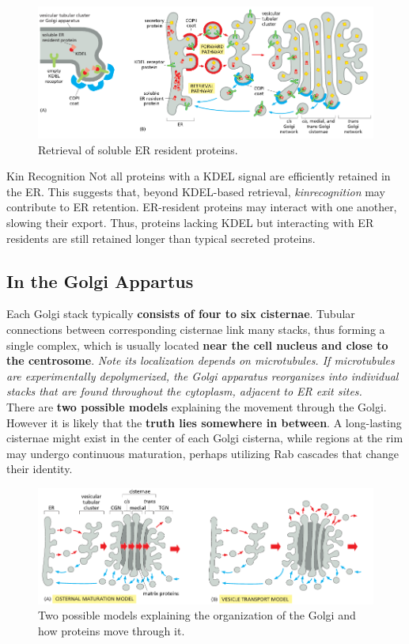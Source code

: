 \documentclass[../main.tex]{subfiles}
\begin{document}
\begin{figure}[H]
	\centering
	\includegraphics[width= \textwidth]{20}
	\caption{Retrieval of soluble ER resident proteins.}
\end{figure}

\begin{RemarkWithTitel}{Kin Recognition}
	Not all proteins with a KDEL signal are efficiently retained in the ER. This suggests that, beyond KDEL-based retrieval, \textit{\gls{kinrecognition}} may contribute to ER retention. ER-resident proteins may interact with one another, slowing their export. Thus, proteins lacking KDEL but interacting with ER residents are still retained longer than typical secreted proteins.
\end{RemarkWithTitel}

\subsection{In the Golgi Appartus}
Each Golgi stack typically \textbf{consists of four to six cisternae}. Tubular connections between corresponding cisternae link many stacks, thus forming a single complex, which is usually located \textbf{near the cell nucleus and close to the centrosome}. \textit{Note its localization depends on microtubules. If microtubules are experimentally depolymerized, the Golgi apparatus reorganizes into individual stacks that are found throughout the cytoplasm, adjacent to ER exit sites.} \\
\indent There are \textbf{two possible models} explaining the movement through the Golgi. However it is likely that the \textbf{truth lies somewhere in between}. A long-lasting cisternae might exist in the center of each Golgi cisterna, while regions at the rim may undergo continuous maturation, perhaps utilizing Rab cascades that change their identity.
\begin{figure}[H]
	\centering
	\includegraphics[width= 0.9 \textwidth]{26}
	\caption{Two possible models explaining the organization of the Golgi and how proteins move through it.}
\end{figure}
\end{document}
